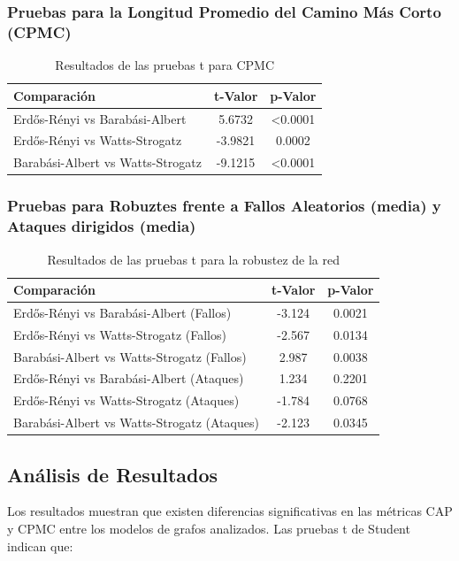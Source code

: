 \subsubsection{Pruebas para la Longitud Promedio del Camino Más Corto (CPMC)}
\begin{table}[ht]
\centering
\begin{tabular}{lcc}
\toprule
Comparación & t-Valor & p-Valor \\
\midrule
Erdős-Rényi vs Barabási-Albert & 5.6732 & \textless 0.0001 \\
Erdős-Rényi vs Watts-Strogatz  & -3.9821 & 0.0002 \\
Barabási-Albert vs Watts-Strogatz & -9.1215 & \textless 0.0001 \\
\bottomrule
\end{tabular}
\caption{Resultados de las pruebas t para CPMC}
\end{table}
\newpage
\subsubsection{Pruebas para Robuztes frente a Fallos Aleatorios (media) y Ataques dirigidos (media) }
\begin{table}[h!]
    \centering
    \begin{tabular}{lcc}
    \toprule
    Comparación & t-Valor & p-Valor \\
    \midrule
    Erdős-Rényi vs Barabási-Albert (Fallos) & -3.124 & 0.0021 \\
    Erdős-Rényi vs Watts-Strogatz (Fallos)  & -2.567 & 0.0134 \\
    Barabási-Albert vs Watts-Strogatz (Fallos) & 2.987 & 0.0038 \\
    Erdős-Rényi vs Barabási-Albert (Ataques) & 1.234 & 0.2201 \\
    Erdős-Rényi vs Watts-Strogatz (Ataques)  & -1.784 & 0.0768 \\
    Barabási-Albert vs Watts-Strogatz (Ataques) & -2.123 & 0.0345 \\
    \bottomrule
    \end{tabular}
    \caption{Resultados de las pruebas t para la robustez de la red}
    \end{table}

\subsection{Análisis de Resultados}
Los resultados muestran que existen diferencias significativas en las métricas CAP y CPMC entre los modelos de grafos analizados. Las pruebas t de Student indican que:

